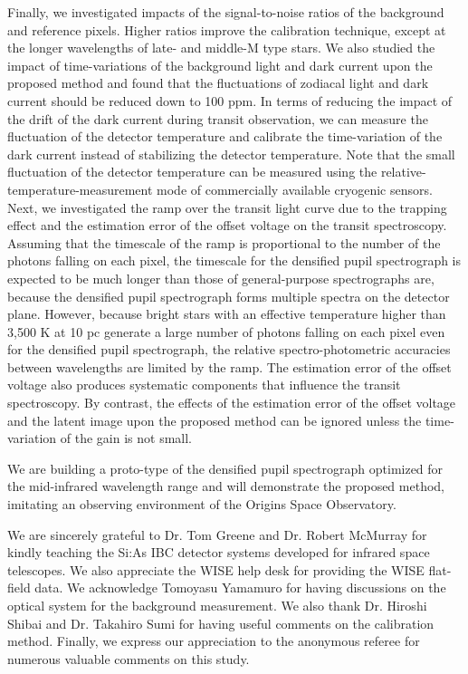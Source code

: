 \documentclass{aastex62}
\begin{document}
Finally, we investigated impacts of the signal-to-noise ratios of the background and reference pixels. Higher ratios improve the calibration technique, except at the longer wavelengths of late- and middle-M type stars. We also studied the impact of time-variations of the background light and dark current upon the proposed method and found that the fluctuations of zodiacal light and dark current should be reduced down to 100 ppm. In terms of reducing the impact of the drift of the dark current during transit observation, we can measure the fluctuation of the detector temperature and calibrate the time-variation of the dark current instead of stabilizing the detector temperature. Note that the small fluctuation of the detector temperature can be measured using the relative-temperature-measurement mode of commercially available cryogenic sensors. Next, we investigated the ramp over the transit light curve due to the trapping effect and the estimation error of the offset voltage on the transit spectroscopy. Assuming that the timescale of the ramp is proportional to the number of the photons falling on each pixel, the timescale for the densified pupil spectrograph is expected to be much longer than those of general-purpose spectrographs are, because the densified pupil spectrograph forms multiple spectra on the detector plane. However, because bright stars with an effective temperature higher than 3,500 K at 10 pc generate a large number of photons falling on each pixel even for the densified pupil spectrograph, the relative spectro-photometric accuracies between wavelengths are limited by the ramp. The estimation error of the offset voltage also produces systematic components that influence the transit spectroscopy. By contrast, the effects of the estimation error of the offset voltage and the latent image upon the proposed method can be ignored unless the time-variation of the gain is not small.

We are building a proto-type of the densified pupil spectrograph optimized for the mid-infrared wavelength range and will demonstrate the proposed method, imitating an observing environment of the Origins Space Observatory.


\acknowledgments

We are sincerely grateful to Dr. Tom Greene and Dr. Robert McMurray for kindly teaching the Si:As IBC detector systems developed for infrared space telescopes. We also appreciate the WISE help desk for providing the WISE flat-field data. We acknowledge Tomoyasu Yamamuro for having discussions on the optical system for the background measurement. We also thank Dr. Hiroshi Shibai and Dr. Takahiro Sumi for having useful comments on the calibration method. Finally, we express our appreciation to the anonymous referee for numerous valuable comments on this study.
\end{document}
